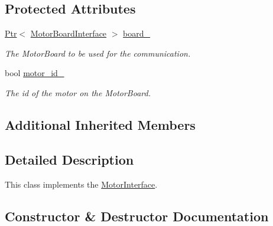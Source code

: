 \subsection*{Protected Attributes}
\begin{DoxyCompactItemize}
\item 
\hyperlink{classblmc__drivers_1_1MotorInterface_ae31f230b9da3674a05543023c90b124c}{Ptr}$<$ \hyperlink{classblmc__drivers_1_1MotorBoardInterface}{Motor\+Board\+Interface} $>$ \hyperlink{classblmc__drivers_1_1Motor_a779365c022edb7d4beb4060dcdb7dd72}{board\+\_\+}\hypertarget{classblmc__drivers_1_1Motor_a779365c022edb7d4beb4060dcdb7dd72}{}\label{classblmc__drivers_1_1Motor_a779365c022edb7d4beb4060dcdb7dd72}

\begin{DoxyCompactList}\small\item\em The Motor\+Board to be used for the communication. \end{DoxyCompactList}\item 
bool \hyperlink{classblmc__drivers_1_1Motor_a614903579bd6001169d11b72bc17042b}{motor\+\_\+id\+\_\+}\hypertarget{classblmc__drivers_1_1Motor_a614903579bd6001169d11b72bc17042b}{}\label{classblmc__drivers_1_1Motor_a614903579bd6001169d11b72bc17042b}

\begin{DoxyCompactList}\small\item\em The id of the motor on the Motor\+Board. \end{DoxyCompactList}\end{DoxyCompactItemize}
\subsection*{Additional Inherited Members}


\subsection{Detailed Description}
This class implements the \hyperlink{classblmc__drivers_1_1MotorInterface}{Motor\+Interface}. 

\subsection{Constructor \& Destructor Documentation}
